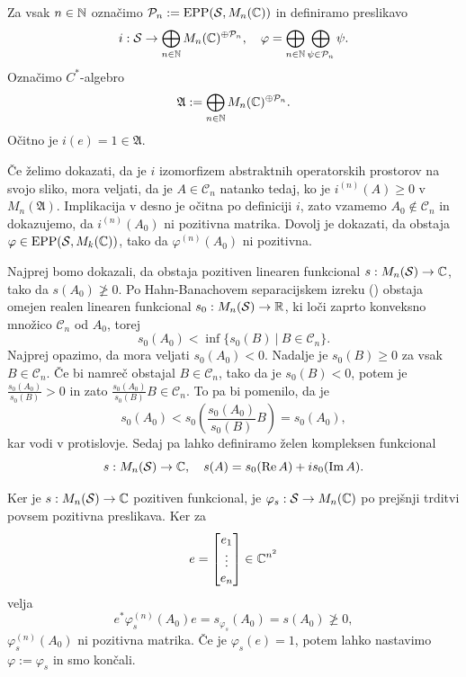 \begin{dokaz}
    Za vsak $n \in \mathbb N$ označimo 
    $\mathcal{P}_n := \operatorname{EPP} (\mathcal{S}, M_n (\mathbb C))$ in definiramo preslikavo 
    $$i: \mathcal{S} \to \bigoplus_{n \in \mathbb N} M_n (\mathbb C) ^{\oplus \mathcal{P}_n},\quad \varphi = \bigoplus_{n \in \mathbb N} \bigoplus_{\psi \in \mathcal{P}_n} \psi.$$
    Označimo $C^*$-algebro $$\mathfrak{A} := \bigoplus_{n \in \mathbb N} M_n (\mathbb C) ^{\oplus \mathcal{P}_n}.$$
    Očitno je $i(e) = 1 \in \mathfrak{A}$.
    
    Če želimo dokazati, da je $i$ izomorfizem abstraktnih operatorskih prostorov na svojo sliko, mora veljati, 
    da je $A \in \mathcal{C}_n$ natanko tedaj, ko je $i^{(n)} (A) \geq 0$ v $M_n(\mathfrak{A})$.
    Implikacija v desno je očitna po definiciji $i$, zato vzamemo $A_0 \notin \mathcal{C}_n$
    in dokazujemo, da $i^{(n)} (A_0)$ ni pozitivna matrika. 
    Dovolj je dokazati, da obstaja $\varphi \in \operatorname{EPP} (\mathcal{S}, M_k (\mathbb C))$,
    tako da $\varphi^{(n)} (A_0)$ ni pozitivna.
    
    Najprej bomo dokazali, da obstaja pozitiven linearen funkcional $s: M_n (\mathcal{S}) \to \mathbb C$,
    tako da $s(A_0) \not\geq 0$.
    Po Hahn-Banachovem separacijskem izreku (\cite[Theorem IV.3.9., str. 111]{conway1990}) obstaja omejen realen linearen funkcional
    $s_0: M_n (\mathcal{S}) \to \mathbb R$, ki loči zaprto konveksno množico $\mathcal{C}_n$ od $A_0$, torej 
    $$ s_0(A_0) < \inf \{ s_0(B)\ |\ B \in \mathcal{C}_n\}.$$
    Najprej opazimo, da mora veljati $s_0 (A_0) < 0$.
    Nadalje je $s_0 (B) \geq 0$ za vsak $B \in \mathcal{C}_n$. Če bi namreč obstajal $B \in \mathcal{C}_n$,
    tako da je $s_0 (B) < 0$, potem je $\frac{s_0 (A_0)}{s_0(B)} > 0$ in zato $\frac{s_0 (A_0)}{s_0(B)} B \in \mathcal{C}_n$.
    To pa bi pomenilo, da je 
    $$s_0 (A_0) < s_0 \left(\frac{s_0 (A_0)}{s_0(B)} B\right) = s_0 (A_0),$$ kar vodi v protislovje.
    Sedaj pa lahko definiramo želen kompleksen funkcional
    $$s : M_n (\mathcal{S}) \to \mathbb C,\quad s(A) = s_0 (\operatorname{Re} A) + i s_0 (\operatorname{Im} A).$$

    Ker je $s: M_n (\mathcal{S}) \to \mathbb C$ pozitiven funkcional, je $\varphi_s : \mathcal{S} \to M_n (\mathbb C)$ po prejšnji trditvi
    povsem pozitivna preslikava. Ker za $$e = \begin{bmatrix}
        e_1 \\ \vdots \\ e_n
    \end{bmatrix} \in \mathbb C^{n^2}$$ velja 
    $$e^* \varphi_s ^{(n)} (A_0) e = s_{\varphi_s} (A_0)= s(A_0) \not\geq 0,$$
    $\varphi_s ^{(n)} (A_0)$ ni pozitivna matrika. Če je $\varphi_s(e) = 1$, potem lahko nastavimo $\varphi := \varphi_s$ in smo končali.


\end{dokaz}
